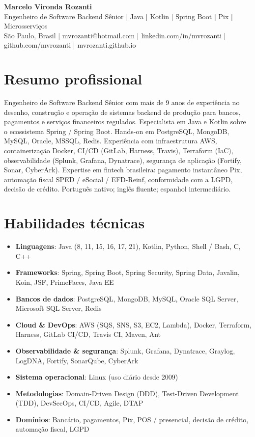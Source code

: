 \documentclass[11pt,a4paper]{article}
\begin{document}
\begin{center}
{\Large\bfseries Marcelo Vironda Rozanti}\\[2pt]
Engenheiro de Software Backend Sênior | Java | Kotlin | Spring Boot | Pix | Microsserviços\\[2pt]
São Paulo, Brasil | mvrozanti@hotmail.com | linkedin.com/in/mvrozanti | github.com/mvrozanti | mvrozanti.github.io
\end{center}

\section{Resumo profissional}
Engenheiro de Software Backend Sênior com mais de 9 anos de experiência no desenho, construção e operação de sistemas backend de produção para bancos, pagamentos e serviços financeiros regulados. Especialista em Java e Kotlin sobre o ecossistema Spring / Spring Boot. Hands-on em PostgreSQL, MongoDB, MySQL, Oracle, MSSQL, Redis. Experiência com infraestrutura AWS, containerização Docker, CI/CD (GitLab, Harness, Travis), Terraform (IaC), observabilidade (Splunk, Grafana, Dynatrace), segurança de aplicação (Fortify, Sonar, CyberArk). Expertise em fintech brasileira: pagamento instantâneo Pix, automação fiscal SPED / eSocial / EFD-Reinf, conformidade com a LGPD, decisão de crédito. Português nativo; inglês fluente; espanhol intermediário.

\section{Habilidades técnicas}
\begin{itemize}
\item \textbf{Linguagens}: Java (8, 11, 15, 16, 17, 21), Kotlin, Python, Shell / Bash, C, C++
\item \textbf{Frameworks}: Spring, Spring Boot, Spring Security, Spring Data, Javalin, Koin, JSF, PrimeFaces, Java EE
\item \textbf{Bancos de dados}: PostgreSQL, MongoDB, MySQL, Oracle SQL Server, Microsoft SQL Server, Redis
\item \textbf{Cloud \& DevOps}: AWS (SQS, SNS, S3, EC2, Lambda), Docker, Terraform, Harness, GitLab CI/CD, Travis CI, Maven, Ant
\item \textbf{Observabilidade \& segurança}: Splunk, Grafana, Dynatrace, Graylog, LogDNA, Fortify, SonarQube, CyberArk
\item \textbf{Sistema operacional}: Linux (uso diário desde 2009)
\item \textbf{Metodologias}: Domain-Driven Design (DDD), Test-Driven Development (TDD), DevSecOps, CI/CD, Agile, DTAP
\item \textbf{Domínios}: Bancário, pagamentos, Pix, POS / presencial, decisão de crédito, automação fiscal, LGPD
\end{itemize}
\end{document}
